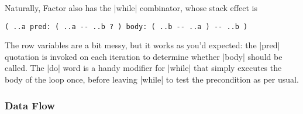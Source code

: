 Naturally, Factor also has the \factor|while| combinator, whose stack effect is
%
\begin{center}
%
  \Verb|( ..a pred: ( ..a -- ..b ? ) body: ( ..b -- ..a ) -- ..b )|
%
\end{center}
%
\noindent The row variables are a bit messy, but it works as you'd expected:
the \factor|pred| quotation is invoked on each iteration to determine whether
\factor|body| should be called.  The \factor|do| word is a handy modifier for
\factor|while| that simply executes the body of the loop once, before leaving
\factor|while| to test the precondition as per usual.

\subsubsection{Data Flow}\label{sec:primer:data-flow}
